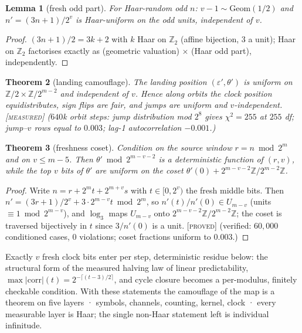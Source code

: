 \documentclass[11pt]{article}
\newtheorem{theorem}{Theorem}[section]
\newtheorem{lemma}[theorem]{Lemma}
\theoremstyle{definition}
\newcommand{\PROVED}{\textup{[\textsc{proved}]}}
\newcommand{\MEASURED}{\textup{[\textsc{measured}]}}
\newcommand{\Z}{\mathbb{Z}}
\begin{document}
\begin{lemma}[fresh odd part]\label{lem:freshodd}
For Haar-random odd $n$: $v - 1 \sim \mathrm{Geom}(1/2)$ and
$n' = (3n+1)/2^{v}$ is Haar-uniform on the odd units, independent of $v$.
\end{lemma}

\begin{proof}
$(3n+1)/2 = 3k+2$ with $k$ Haar on $\Z_2$ (affine bijection, $3$ a unit);
Haar on $\Z_2$ factorises exactly as (geometric valuation) $\times$ (Haar
odd part), independently.
\end{proof}

\begin{theorem}[landing camouflage]\label{thm:landing}
The landing position $(\varepsilon', \theta')$ is uniform on
$\Z/2 \times \Z/2^{m-2}$ and independent of $v$. Hence along orbits the
clock position equidistributes, sign flips are fair, and jumps are uniform
and $v$-independent. \MEASURED{} ($640$k orbit steps: jump distribution
mod $2^8$ gives $\chi^2 = 255$ at $255$ df; jump--$v$ rows equal to
$0.003$; lag-1 autocorrelation $-0.001$.)
\end{theorem}

\begin{theorem}[freshness coset]\label{thm:freshcoset}
Condition on the source window $r = n \bmod 2^m$ and on $v \le m-5$. Then
$\theta' \bmod 2^{m-v-2}$ is a deterministic function of $(r, v)$, while
the top $v$ bits of $\theta'$ are uniform on the coset
$\theta'(0) + 2^{m-v-2}\Z / 2^{m-2}\Z$.
\end{theorem}

\begin{proof}
Write $n = r + 2^m t + 2^{m+v}s$ with $t \in [0, 2^v)$ the fresh middle
bits. Then $n' = (3r+1)/2^v + 3 \cdot 2^{m-v} t \bmod 2^m$, so
$n'(t)/n'(0) \in U_{m-v}$ (units $\equiv 1 \bmod 2^{m-v}$), and
$\log_3$ maps $U_{m-v}$ onto $2^{m-v-2}\Z/2^{m-2}\Z$; the coset is
traversed bijectively in $t$ since $3/n'(0)$ is a unit. \PROVED{}
(verified: $60{,}000$ conditioned cases, $0$ violations; coset fractions
uniform to $0.003$.)
\end{proof}

Exactly $v$ fresh clock bits enter per step, deterministic residue below:
the structural form of the measured halving law of linear predictability,
$\max|\mathrm{corr}|(t) = 2^{-\lceil (t-3)/2\rceil}$, and cycle closure
becomes a per-modulus, finitely checkable condition. With these statements
the camouflage of the map is a theorem on five layers · symbols, channels,
counting, kernel, clock · every measurable layer is Haar; the single
non-Haar statement left is individual infinitude.
\end{document}
